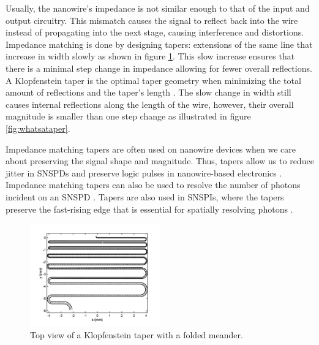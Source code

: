 Usually, the nanowire's impedance is not similar enough to that of the input and output circuitry. This mismatch causes the signal to reflect back into the wire instead 
of propagating into the next stage, causing interference and distortions. Impedance 
matching is done by designing tapers: extensions of the same line that increase in 
width slowly as shown in figure \ref{fig:thewiredesign}. This slow increase ensures 
that there is a minimal step change in impedance allowing for fewer overall reflections. A Klopfenstein taper is the optimal taper geometry when minimizing the total amount 
of reflections and the taper's length \cite{klopfenstein_transmission_1956}. 
The slow change in width still causes internal reflections along the length of the 
wire, however, their overall magnitude is smaller than one step change as illustrated in 
figure \ref{fig:whatsataper}.

Impedance matching tapers are often used on nanowire devices when we care about preserving
the signal shape and magnitude. Thus, tapers allow us to reduce jitter in SNSPDs and preserve logic pulses in
nanowire-based electronics \cite{snspd-tapers-paper, maximizing_ic_w_taper}. 
Impedance matching tapers can also be used to resolve the 
number of photons incident on an SNSPD \cite{pnr}.
Tapers are also used in SNSPIs, where the tapers
preserve the fast-rising edge that is essential for spatially
resolving photons \cite{snspi_paper}. 

\begin{figure}
    \centering
\includegraphics[width=0.5\textwidth]{figs/wire_matlab.png}
    \caption{Top view of a Klopfenstein taper with a folded meander.}
    \label{fig:thewiredesign}
\end{figure}

